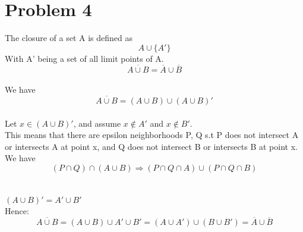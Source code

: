 \documentclass{article}
\begin{document}
 \section*{Problem 4}
 The closure of a set A is defined as $$A \cup \{A'\}$$ With A' being a set of all limit points of A.
 $$\overline{A \cup B} = \overline{A} \cup \overline{B}$$
 \\We have $$\overline{A \cup B} = (A \cup B) \cup {(A \cup B)'}$$
 \\Let $x \in (A \cup B)'$, and assume $x \not \in A'$ and $x \not \in B'$.
 \\This means that there are epsilon neighborhoods P, Q s.t P does not intersect A or intersects A at point x, and Q does not intersect B or intersects B at point x.
 \\We have $$(P \cap Q) \cap (A \cup B) \Rightarrow (P \cap Q \cap A) \cup (P \cap Q \cap B)$$
 \\
 \\$(A \cup B)' = A' \cup B'$
 \\Hence: $$\overline{A \cup B} = (A \cup B) \cup A' \cup B' = (A \cup A') \cup (B \cup B') = \overline{A} \cup \overline{B}$$
\end{document}
